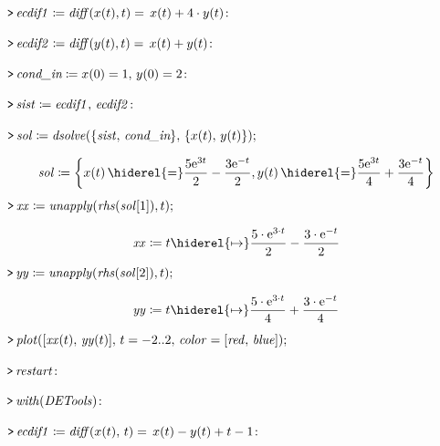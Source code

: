 \documentclass{article}
\begin{document}
\mapleinput
{$ \displaystyle \texttt{>\,} \mathit{ecdif1} \coloneqq \mathit{diff} (x (t),t)=\,x (t)+4\cdot y (t)\colon  $}

\mapleinput
{$ \displaystyle \texttt{>\,} \mathit{ecdif2} \coloneqq \mathit{diff} (y (t),t)=\,x (t)+y (t)\colon  $}

\mapleinput
{$ \displaystyle \texttt{>\,} \textit{cond\_in} \coloneqq x (0)=1,\,y (0)=2\colon  $}

\mapleinput
{$ \displaystyle \texttt{>\,} \mathit{sist} \coloneqq \mathit{ecdif1} ,\,\mathit{ecdif2} \colon  $}

\mapleinput
{$ \displaystyle \texttt{>\,} \mathit{sol} \coloneqq \mathit{dsolve} (\{\mathit{sist} ,\,\textit{cond\_in} \},\,\{x (t),\,y (t)\}); $}

\begin{dmath}\label{(5)}
\mathit{sol} \coloneqq \left\{x \! \left(t \right) \hiderel{=} \frac{5 {\mathrm e}^{3 t}}{2}-\frac{3 {\mathrm e}^{-t}}{2},y \! \left(t \right) \hiderel{=} \frac{5 {\mathrm e}^{3 t}}{4}+\frac{3 {\mathrm e}^{-t}}{4}\right\}
\end{dmath}
\mapleinput
{$ \displaystyle \texttt{>\,} \mathit{xx} \coloneqq \mathit{unapply} (\mathit{rhs} (\mathit{sol} [1]),t); $}

\begin{dmath}\label{(6)}
\mathit{xx} \coloneqq t \hiderel{\mapsto }\frac{5\cdot {\mathrm e}^{3\cdot t}}{2}-\frac{3\cdot {\mathrm e}^{-t}}{2}
\end{dmath}
\mapleinput
{$ \displaystyle \texttt{>\,} \mathit{yy} \coloneqq \mathit{unapply} (\mathit{rhs} (\mathit{sol} [2]),t); $}

\begin{dmath}\label{(7)}
\mathit{yy} \coloneqq t \hiderel{\mapsto }\frac{5\cdot {\mathrm e}^{3\cdot t}}{4}+\frac{3\cdot {\mathrm e}^{-t}}{4}
\end{dmath}
\mapleinput
{$ \displaystyle \texttt{>\,} \mathit{plot} ([\mathit{xx} (t),\,\mathit{yy} (t)],\,t =-2..2,\,\mathit{color} =[\mathit{red} ,\,\mathit{blue}]); $}

{}
\mapleinput
{$ \displaystyle \texttt{>\,} \mathit{restart} \colon  $}

\mapleinput
{$ \displaystyle \texttt{>\,} \mathit{with} (\mathit{DETools})\colon  $}

\mapleinput
{$ \displaystyle \texttt{>\,} \mathit{ecdif1} \coloneqq \mathit{diff} (x (t),\,t)=\,x (t)-y (t)+t -1\colon  $}
\end{document}
